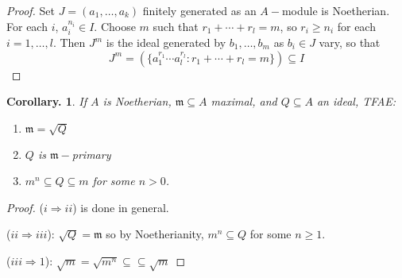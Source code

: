\documentclass[11pt, a4paper]{memoir}
\newcommand{\imp}[2]{($#1\Rightarrow#2$)\hspace{0.2cm}}
\theoremstyle{change}
\newtheorem{corollary}[theorem]{Corollary.}
\theoremstyle{plain}
\theoremstyle{nonumberplain}
\newtheorem{proof}{Proof}
\numberwithin{equation}{section}
\begin{document}
\begin{proof}
    Set $J=(a_1,\ldots,a_k)$ finitely generated as an $A-$module is Noetherian.
    For each $i$, $a_i^{n_i}\in I$.
    Choose $m$ such that $r_1+\cdots+r_l=m$, so $r_i\geq n_i$ for each $i=1,\ldots,l$.
    Then $J^m$ is the ideal generated by $b_1,\ldots,b_m$ as $b_i\in J$ vary, so that
    \begin{equation*}
        J^m=\left(\{a_1^{r_1}\cdots a_l^{r_l}:r_1+\cdots+r_l=m\}\right)\subseteq I
    \end{equation*}
\end{proof}
\begin{corollary}
    If $A$ is Noetherian, $\mathfrak{m}\subseteq A$ maximal, and $Q\subseteq A$ an ideal, TFAE:
    \begin{enumerate}[nl,r]
        \item $\mathfrak{m}=\sqrt{Q}$
        \item $Q$ is $\mathfrak{m}-$primary
        \item $m^n\subseteq Q\subseteq m$ for some $n>0$.
    \end{enumerate}
\end{corollary}
\begin{proof}
    \imp{i}{ii} is done in general.

    \imp{ii}{iii}: $\sqrt{Q}=\mathfrak{m}$ so by Noetherianity, $m^n\subseteq Q$ for some $n\geq 1$.

    \imp{iii}{1}: $\sqrt{m}=\sqrt{m^n}\subseteq\subseteq\sqrt{m}$
\end{proof}
\end{document}
